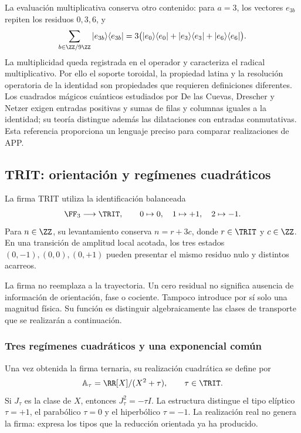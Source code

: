 La evaluación multiplicativa conserva otro contenido: para \(a=3\), los
vectores \(e_{3b}\) repiten los residuos \(0,3,6\), y
\[
 \sum_{b\in\ZZ/9\ZZ}|e_{3b}\rangle\langle e_{3b}|
 =3\bigl(|e_0\rangle\langle e_0|+|e_3\rangle\langle e_3|
                    +|e_6\rangle\langle e_6|\bigr).
\]
La multiplicidad queda registrada en el operador y caracteriza el radical
multiplicativo. Por ello el soporte toroidal, la propiedad latina y la
resolución operatoria de la identidad son propiedades que requieren
definiciones diferentes. Los cuadrados mágicos cuánticos estudiados por
De las Cuevas, Drescher y Netzer exigen entradas positivas y sumas de filas
y columnas iguales a la identidad; su teoría distingue además las
dilataciones con entradas conmutativas\cite{delascuevas2020}. Esta referencia
proporciona un lenguaje preciso para comparar realizaciones de APP.

\subsection{TRIT: orientación y regímenes cuadráticos}

\begin{definition}
La firma TRIT utiliza la identificación balanceada
\[
 \FF_3\longrightarrow\TRIT,\qquad 0\mapsto0,\quad1\mapsto+1,\quad2\mapsto-1.
\]
Para \(n\in\ZZ\), su levantamiento conserva \(n=r+3c\), donde \(r\in\TRIT\) y \(c\in\ZZ\). En una transición de amplitud local acotada, los tres estados \((0,-1),(0,0),(0,+1)\) pueden presentar el mismo residuo nulo y distintos acarreos.
\end{definition}

La firma no reemplaza a la trayectoria. Un cero residual no significa ausencia de información de orientación, fase o cociente. Tampoco introduce por sí solo una magnitud física. Su función es distinguir algebraicamente las clases de transporte que se realizarán a continuación.

\subsubsection{Tres regímenes cuadráticos y una exponencial común}

Una vez obtenida la firma ternaria, su realización cuadrática se define por
\begin{equation}
 \mathbb A_\tau=\RR[X]/(X^2+\tau),\qquad \tau\in\TRIT.
 \label{eq:algebras-trit}
\end{equation}
Si \(J_\tau\) es la clase de \(X\), entonces \(J_\tau^2=-\tau I\). La estructura distingue el tipo elíptico \(\tau=+1\), el parabólico \(\tau=0\) y el hiperbólico \(\tau=-1\). La realización real no genera la firma: expresa los tipos que la reducción orientada ya ha producido.


